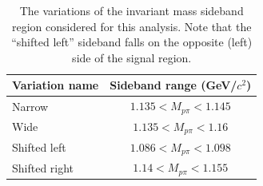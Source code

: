\begin{table}[ht]
    \centering
    \caption{The variations of the \lmb invariant mass sideband region considered for this analysis. Note that the ``shifted left'' sideband falls on the opposite (left) side of the signal region.}
    \label{tab:sideband_region_variations}
    \begin{tabular}{l c}
        \hline
        Variation name & Sideband range (GeV/$c^2$) \\
        \hline
        Narrow & $1.135 < M_{p\pi} < 1.145$ \\
        Wide & $1.135 < M_{p\pi} < 1.16$ \\
        Shifted left & $1.086 < M_{p\pi} < 1.098$ \\
        Shifted right & $1.14 < M_{p\pi} < 1.155$ \\
        \hline
    \end{tabular}
\end{table}

